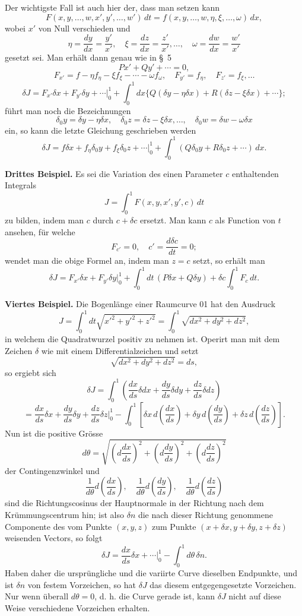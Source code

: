 \documentclass[11pt,a4paper,leqno]{article}
\begin{document}
Der wichtigste Fall ist auch hier der, dass man setzen kann
\[
F(x,y,\ldots,w,x',y',\ldots,w')\,dt=f(x,y,\ldots,w,\eta,\xi,\ldots,\omega)\,dx,
\]
wobei \(x'\) von Null verschieden und
\[
\eta=\frac{dy}{dx}=\frac{y'}{x'},\quad \xi=\frac{dz}{dx}=\frac{z'}{x'},\ldots,\quad \omega=\frac{dw}{dx}=\frac{w'}{x'}
\]
gesetzt sei. Man erhält dann genau wie in \S~5
\[
Px'+Qy'+\cdots=0,
\]
\[
F_{x'}=f-\eta f_\eta-\xi f_\xi-\cdots-\omega f_\omega,
\quad F_{y'}=f_\eta,\quad F_{z'}=f_\xi,\ldots
\]
\[
\delta J=F_{x'}\delta x+F_{y'}\delta y+\cdots\bigg|_0^1+\int_0^1dx\{Q(\delta y-\eta\delta x)+R(\delta z-\xi\delta x)+\cdots\};
\]
führt man noch die Bezeichnungen
\[
\delta_0y=\delta y-\eta\delta x,\quad \delta_0z=\delta z-\xi\delta x,\ldots,\quad \delta_0w=\delta w-\omega\delta x
\]
ein, so kann die letzte Gleichung geschrieben werden
\[
\delta J=f\delta x+f_\eta\delta_0y+f_\xi\delta_0z+\cdots\bigg|_0^1
+\int_0^1(Q\delta_0y+R\delta_0z+\cdots)\,dx.
\]

\medskip
\noindent\textbf{Drittes Beispiel.} Es sei die Variation des einen Parameter \(c\) enthaltenden Integrals
\[
J=\int_0^1F(x,y,x',y',c)\,dt
\]
zu bilden, indem man \(c\) durch \(c+\delta c\) ersetzt. Man kann \(c\) als Function von \(t\) ansehen, für welche
\[
F_{c'}=0,\quad c'=\frac{d\delta c}{dt}=0;
\]
wendet man die obige Formel an, indem man \(z=c\) setzt, so erhält man
\[
\delta J=F_{x'}\delta x+F_{y'}\delta y\bigg|_0^1+\int_0^1dt\,(P\delta x+Q\delta y)+\delta c\int_0^1F_c\,dt.
\]

\medskip
\noindent\textbf{Viertes Beispiel.} Die Bogenlänge einer Raumcurve 01 hat den Ausdruck
\[
J=\int_0^1dt\sqrt{x'^2+y'^2+z'^2}=\int_0^1\sqrt{dx^2+dy^2+dz^2},
\]
in welchem die Quadratwurzel positiv zu nehmen ist. Operirt man mit dem Zeichen \(\delta\) wie mit einem Differentialzeichen und setzt
\[
\sqrt{dx^2+dy^2+dz^2}=ds,
\]
so ergiebt sich
\[
\delta J=\int_0^1\left(\frac{dx}{ds}\delta dx+\frac{dy}{ds}\delta dy+\frac{dz}{ds}\delta dz\right)
\]
\[
=\frac{dx}{ds}\delta x+\frac{dy}{ds}\delta y+\frac{dz}{ds}\delta z\bigg|_0^1
-\int_0^1\left[\delta x\,d\left(\frac{dx}{ds}\right)+\delta y\,d\left(\frac{dy}{ds}\right)+\delta z\,d\left(\frac{dz}{ds}\right)\right].
\]
Nun ist die positive Grösse
\[
d\theta=\sqrt{\left(d\frac{dx}{ds}\right)^2+\left(d\frac{dy}{ds}\right)^2+\left(d\frac{dz}{ds}\right)^2}
\]
der Contingenzwinkel und
\[
\frac{1}{d\theta}d\left(\frac{dx}{ds}\right),\quad
\frac{1}{d\theta}d\left(\frac{dy}{ds}\right),\quad
\frac{1}{d\theta}d\left(\frac{dz}{ds}\right)
\]
sind die Richtungscosinus der Hauptnormale in der Richtung nach dem Krümmungscentrum hin; ist also \(\delta n\) die nach dieser Richtung genommene Componente des vom Punkte \((x,y,z)\) zum Punkte \((x+\delta x,y+\delta y,z+\delta z)\) weisenden Vectors, so folgt
\[
\delta J=\frac{dx}{ds}\delta x+\cdots\bigg|_0^1-\int_0^1d\theta\,\delta n.
\]
Haben daher die ursprüngliche und die variirte Curve dieselben Endpunkte, und ist \(\delta n\) von festem Vorzeichen, so hat \(\delta J\) das diesem entgegengesetzte Vorzeichen. Nur wenn überall \(d\theta=0\), d. h. die Curve gerade ist, kann \(\delta J\) nicht auf diese Weise verschiedene Vorzeichen erhalten.
\end{document}
